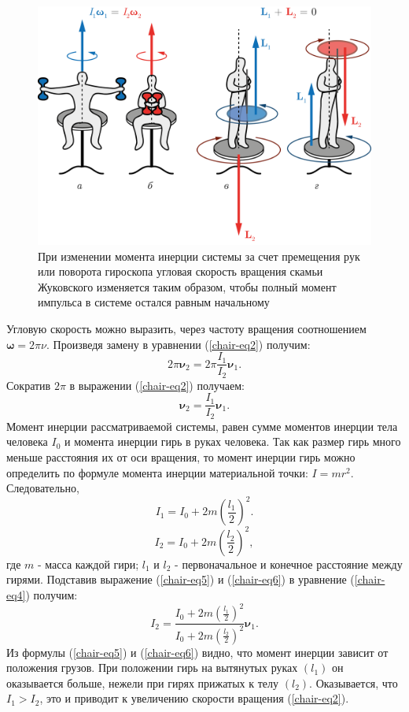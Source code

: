 \documentclass[All.tex]{subfiles}
\begin{document}
  	\begin{figure}[H] 	
 	\centering 	
 	\includegraphics[width=0.9\linewidth]{chair-2.png}
 	\caption{При изменении момента инерции системы за счет премещения рук или поворота гироскопа угловая скорость вращения скамьи Жуковского изменяется таким образом, чтобы полный момент импульса в системе остался равным начальному}
 	\label{chair-2}
 	
 \end{figure}
 Угловую скорость можно выразить, через частоту вращения соотношением $ \bm{\omega} = 2\pi \nu  $.
 Произведя замену в уравнении (\ref{chair-eq2}) получим:
 \begin{equation}\label{chair-eq3}
 2\pi \bm{\nu}_{2} = 2\pi \frac{I_{1}}{I_{2}}\bm{\nu}_{1}.
 \end{equation}
 Сократив $  2\pi $ в выражении (\ref{chair-eq2}) получаем:
 \begin{equation}\label{chair-eq4}
 \bm{\nu}_{2} = \frac{I_{1}}{I_{2}}\bm{\nu}_{1}.
 \end{equation}
Момент инерции рассматриваемой системы, равен сумме моментов инерции тела человека $ I_{0} $ и момента инерции гирь в руках человека. Так как размер гирь много меньше расстояния их от оси вращения, то момент инерции гирь можно определить по формуле момента инерции материальной точки: $ I = mr^{2} $.
Следовательно,
\begin{equation}\label{chair-eq5}
I_{1} = I_{0} + 2m \left(\frac{l_{1}}{2} \right)^{2}.
\end{equation}
\begin{equation}\label{chair-eq6}
I_{2} = I_{0} + 2m \left(\frac{l_{2}}{2} \right)^{2} ,
\end{equation}
где $ m $ - масса каждой гири; $ l_{1} $ и $ l_{2} $ - первоначальное и конечное  расстояние между гирями.
Подставив выражение  (\ref{chair-eq5}) и  (\ref{chair-eq6}) в уравнение (\ref{chair-eq4}) получим:
\begin{equation}\label{chair-eq7}
I_{2} =  \frac{I_{0} + 2m \left(\frac{l_{1}}{2} \right)^{2}}{I_{0} + 2m \left(\frac{l_{2}}{2} \right)^{2}}\bm{\nu}_{1}.
\end{equation}
Из формулы  (\ref{chair-eq5}) и  (\ref{chair-eq6}) видно, что момент инерции зависит от положения грузов. 
При положении гирь на вытянутых руках $ (l_{1}) $ он оказывается больше, нежели при гирях прижатых к телу $ (l_{2}) $.
Оказывается, что $ I_{1} > I_{2} $, это и приводит к увеличению скорости вращения (\ref{chair-eq2}).
\end{document}
